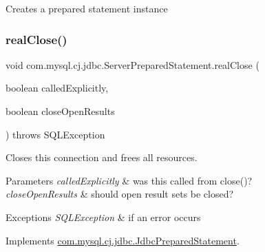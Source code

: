 Creates a prepared statement instance \mbox{\label{classcom_1_1mysql_1_1cj_1_1jdbc_1_1_server_prepared_statement_a1bc3e61ca02b73fbbdcc74c8528b41eb}} 
\subsubsection{\texorpdfstring{real\+Close()}{realClose()}}
{\footnotesize\ttfamily void com.\+mysql.\+cj.\+jdbc.\+Server\+Prepared\+Statement.\+real\+Close (\begin{DoxyParamCaption}\item[{boolean}]{called\+Explicitly,  }\item[{boolean}]{close\+Open\+Results }\end{DoxyParamCaption}) throws S\+Q\+L\+Exception}

Closes this connection and frees all resources.


\begin{DoxyParams}{Parameters}
{\em called\+Explicitly} & was this called from close()? \\
\hline
{\em close\+Open\+Results} & should open result sets be closed?\\
\hline
\end{DoxyParams}

\begin{DoxyExceptions}{Exceptions}
{\em S\+Q\+L\+Exception} & if an error occurs \\
\hline
\end{DoxyExceptions}


Implements \mbox{\hyperlink{interfacecom_1_1mysql_1_1cj_1_1jdbc_1_1_jdbc_prepared_statement}{com.\+mysql.\+cj.\+jdbc.\+Jdbc\+Prepared\+Statement}}.

\mbox{\label{classcom_1_1mysql_1_1cj_1_1jdbc_1_1_server_prepared_statement_a3cf52e5d0562a9bf53b44f162dd78fbf}} 
